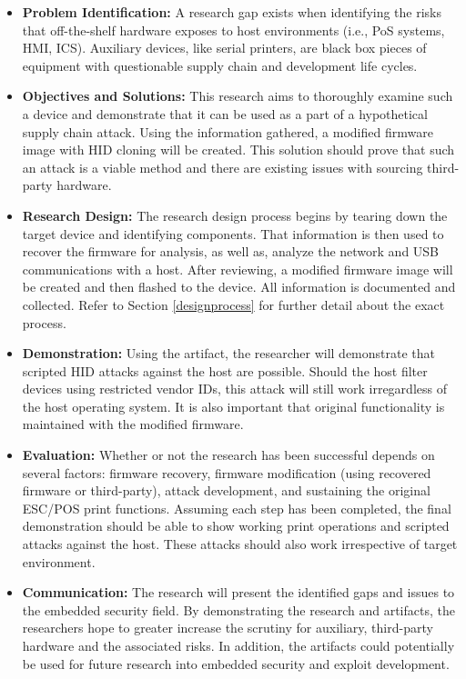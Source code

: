 
\begin{itemize}
  \item \textbf{Problem Identification:} A research gap exists when identifying the risks that off-the-shelf hardware exposes to host environments (i.e., PoS systems, HMI, ICS). Auxiliary devices, like serial printers, are black box pieces of equipment with questionable supply chain and development life cycles.
  \item \textbf{Objectives and Solutions:} This research aims to thoroughly examine such a device and demonstrate that it can be used as a part of a hypothetical supply chain attack. Using the information gathered, a modified firmware image with HID cloning will be created. This solution should prove that such an attack is a viable method and there are existing issues with sourcing third-party hardware.
  \item \textbf{Research Design:} The research design process begins by tearing down the target device and identifying components. That information is then used to recover the firmware for analysis, as well as, analyze the network and USB communications with a host. After reviewing, a modified firmware image will be created and then flashed to the device. All information is documented and collected. Refer to Section \ref{designprocess} for further detail about the exact process.
  \item \textbf{Demonstration:} Using the artifact, the researcher will demonstrate that scripted HID attacks against the host are possible. Should the host filter devices using restricted vendor IDs, this attack will still work irregardless of the host operating system. It is also important that original functionality is maintained with the modified firmware.
  \item \textbf{Evaluation:} Whether or not the research has been successful depends on several factors: firmware recovery, firmware modification (using recovered firmware or third-party), attack development, and sustaining the original ESC/POS print functions. Assuming each step has been completed, the final demonstration should be able to show working print operations and scripted attacks against the host. These attacks should also work irrespective of target environment.
  \item \textbf{Communication:} The research will present the identified gaps and issues to the embedded security field. By demonstrating the research and artifacts, the researchers hope to greater increase the scrutiny for auxiliary, third-party hardware and the associated risks. In addition, the artifacts could potentially be used for future research into embedded security and exploit development.
\end{itemize}

